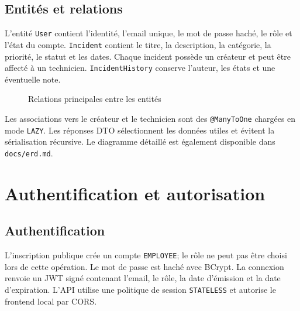 \documentclass[12pt,a4paper]{report}
\begin{document}
\section{Entités et relations}
L'entité \texttt{User} contient l'identité, l'email unique, le mot de passe haché, le rôle et l'état du compte. \texttt{Incident} contient le titre, la description, la catégorie, la priorité, le statut et les dates. Chaque incident possède un créateur et peut être affecté à un technicien. \texttt{IncidentHistory} conserve l'auteur, les états et une éventuelle note.
\begin{figure}[H]\centering{}\caption{Relations principales entre les entités}\end{figure}
Les associations vers le créateur et le technicien sont des \texttt{@ManyToOne} chargées en mode \texttt{LAZY}. Les réponses DTO sélectionnent les données utiles et évitent la sérialisation récursive. Le diagramme détaillé est également disponible dans \texttt{docs/erd.md}.
\chapter{Authentification et autorisation}
\section{Authentification}
L'inscription publique crée un compte \texttt{EMPLOYEE}; le rôle ne peut pas être choisi lors de cette opération. Le mot de passe est haché avec BCrypt. La connexion renvoie un JWT signé contenant l'email, le rôle, la date d'émission et la date d'expiration. L'API utilise une politique de session \texttt{STATELESS} et autorise le frontend local par CORS.
\end{document}
